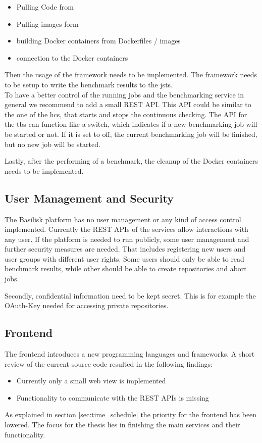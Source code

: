 \begin{itemize}
	\item Pulling Code from \gh{}
	\item Pulling images form \dockh{}
	
	\item building Docker containers from Dockerfiles / images
	
	\item connection to the Docker containers
\end{itemize}

Then the usage of the \iguana{} framework needs to be implemented.
The framework needs to be setup to write the benchmark results to the \acl{jsts}.
\\

To have a better control of the running jobs and the benchmarking service in general we recommend to add a small REST API.
This API could be similar to the one of the \ac{hcs}, that starts and stops the continuous checking.
The API for the \ac{tbs} can function like a switch, which indicates if a new benchmarking job will be started or not.
If it is set to off, the current benchmarking job will be finished, but no new job will be started.

Lastly, after the performing of a benchmark, the cleanup of the Docker containers needs to be implemented.

\subsection{User Management and Security}
\label{sec:review_user_management}
The Basilisk platform has no user management or any kind of access control implemented.
Currently the REST APIs of the services allow interactions with any user.
If the platform is needed to run publicly, some user management and further security measures are needed.
That includes registering new users and user groups with different user rights.
Some users should only be able to read benchmark results, while other should be able to create repositories and abort jobs.

Secondly, confidential information need to be kept secret.
This is for example the OAuth-Key needed for accessing private \gh{} repositories.


\subsection{Frontend}
\label{sec:review_frontend}
The frontend introduces a new programming languages and frameworks.
A short review of the current source code resulted in the following findings:
\begin{itemize}
	\item Currently only a small web view is implemented
	\item Functionality to communicate with the REST APIs is missing
\end{itemize}


As explained in section \ref{sec:time_schedule} the priority for the frontend has been lowered.
The focus for the thesis lies in finishing the main services and their functionality.

